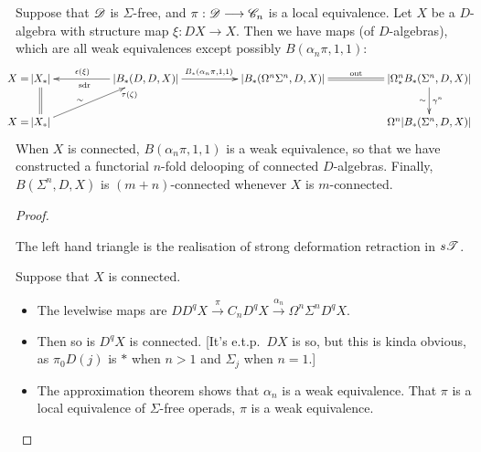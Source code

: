 \documentclass[11pt]{article}
\begin{document}
\begin{Operads}
\begin{itemise}

\end{itemise}


\begin{thm*}[13.1]
Suppose that $\mathscr{D}$ is $\Sigma$-free, and $\pi:\mathscr{D}\longrightarrow\mathscr{C}_n$ is a local equivalence. Let $X$ be a $D$-algebra with structure map $\xi:DX\to X$. Then we have maps (of $D$-algebras), which are all weak equivalences except possibly $B(\alpha_n\pi,1,1)$:
\[\quad \xymatrix@C=1.8cm{
\makebox[0cm][r]{$X=$\,}\ar@{=}[d]{|X_*|}&\ar[l]_{\epsilon(\xi) \qquad}^{\textup{sdr\qquad}}
{|B_*(D,D,X)|} \ar[r]^{B_*(\alpha_n\pi,1,1)\quad }
&{|B_*(\Omega^n\Sigma^n,D,X)|}\ar@{=}[r]^{\textup{out}}&{|\Omega^n_*B_*(\Sigma^n,D,X)|} \ar[d]^{\gamma^n}_\sim\\
\makebox[0cm][r]{$X=$\,}{|X_*|}\ar[ur]_(.8){\tau(\zeta)}^(.4)\sim&
&&\Omega^n{|B_*(\Sigma^n,D,X)|}
}\]
When $X$ is connected, $B(\alpha_n\pi,1,1)$ is a weak equivalence, so that we have constructed a functorial $n$-fold delooping of connected $D$-algebras. Finally, $B(\Sigma^n,D,X)$ is $(m+n)$-connected whenever $X$ is $m$-connected.
\end{thm*}
\begin{proof}
\begin{itemise}
\item The left hand triangle is the realisation of strong deformation retraction in $s\mathscr{T}$.
\item Suppose that $X$ is connected.
\begin{itemize}\squishlist
\item The levelwise maps are $DD^{q}X\overset{\pi}{\to} C_nD^{q}X\overset{\alpha_n}{\to} \Omega^n\Sigma^nD^qX$.
\item Then so is $D^qX$ is connected. [It's e.t.p.\ $DX$ is so, but this is kinda obvious, as $\pi_0D(j)$ is $*$ when $n>1$ and $\Sigma_j$ when $n=1$.]
\item The approximation theorem shows that $\alpha_n$ is a weak equivalence. That $\pi$ is a local equivalence of $\Sigma$-free operads, $\pi$ is a weak equivalence.

\end{itemize}
\end{itemise}
\end{proof}
\end{Operads}
\end{document}
